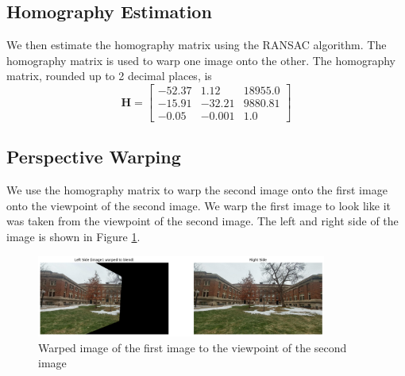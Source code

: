 \documentclass[10pt]{article}
\begin{document}
    \subsection*{\textbf{Homography Estimation}}
    We then estimate the homography matrix using the RANSAC algorithm. The
    homography matrix is used to warp one image onto the other. The homography matrix,
    rounded up to 2 decimal places, is
    \begin{equation*}
        \mathbf{H} = \begin{bmatrix}
            -52.37 & 1.12 & 18955.0 \\
            -15.91 & -32.21 & 9880.81 \\
            -0.05 & -0.001 & 1.0
        \end{bmatrix}
    \end{equation*}

    \subsection*{\textbf{Perspective Warping}}
    We use the homography matrix to warp the second image onto the first image onto
    the viewpoint of the second image. We warp the first image to look like it was
    taken from the viewpoint of the second image. The left and right side of the image
    is shown in Figure \ref{fig:warped}.
    \begin{figure}[h]
        \centering
        \includegraphics[width=0.85\textwidth]{Assets/warped.png}
        \caption{Warped image of the first image to the viewpoint of the second image}
        \label{fig:warped}
    \end{figure}
\end{document}
